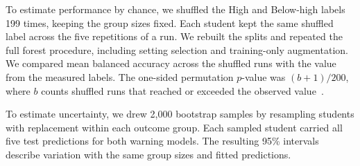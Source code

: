 To estimate performance by chance, we shuffled the High and Below-high labels 199 times, keeping the group sizes fixed. Each student kept the same shuffled label across the five repetitions of a run. We rebuilt the splits and repeated the full forest procedure, including setting selection and training-only augmentation. We compared mean balanced accuracy across the shuffled runs with the value from the measured labels. The one-sided permutation \(p\)-value was \((b+1)/200\), where \(b\) counts shuffled runs that reached or exceeded the observed value~\cite{phipson2010permutation}.

To estimate uncertainty, we drew 2,000 bootstrap samples by resampling students with replacement within each outcome group. Each sampled student carried all five test predictions for both warning models. The resulting 95\% intervals describe variation with the same group sizes and fitted predictions.

